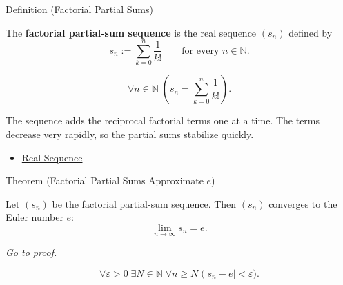 \begin{definitionbox}{Definition (Factorial Partial Sums)}
\begin{definition}
\label{def:factorial-partial-sums}
The \textbf{factorial partial-sum sequence} is the real sequence $(s_n)$
defined by
\[
  s_n:=\sum_{k=0}^{n}\frac{1}{k!}
  \qquad\text{for every } n\in\mathbb{N}.
\]
\end{definition}
\end{definitionbox}

\begin{remark*}
\[
\forall n\in\mathbb{N}\;
\left(
  s_n=\sum_{k=0}^{n}\frac{1}{k!}
\right).
\]
\end{remark*}

\begin{remark*}[Interpretation]
The sequence adds the reciprocal factorial terms one at a time. The terms
decrease very rapidly, so the partial sums stabilize quickly.
\end{remark*}

\begin{dependencies}
\begin{itemize}
  \item \hyperref[def:real-sequence]{Real Sequence}
\end{itemize}
\end{dependencies}


\begin{theorembox}{Theorem (Factorial Partial Sums Approximate $e$)}
\begin{theorem}
\label{thm:factorial-partial-sums-approximate-e}
Let $(s_n)$ be the factorial partial-sum sequence. Then $(s_n)$ converges
to the Euler number $e$:
\[
  \lim_{n\to\infty}s_n=e.
\]

\smallskip
\noindent
\hyperref[prf:factorial-partial-sums-approximate-e]{\textit{Go to proof.}}
\end{theorem}
\end{theorembox}

\begin{remark*}
\[
\forall \varepsilon>0\;\exists N\in\mathbb{N}\;\forall n\ge N
\;\bigl(|s_n-e|<\varepsilon\bigr).
\]
\end{remark*}

